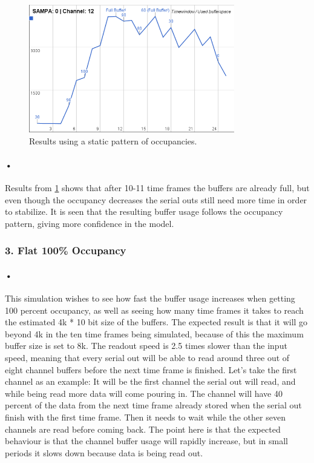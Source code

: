 \documentclass[a4paper, 12pt, openright, twoside]{report}
\begin{document}
\begin{figure}[h!]
	\centering
		\includegraphics[width=0.8\textwidth]{images/results-alternating.png}
		\caption{Results using a static pattern of occupancies.}
		\label{fig:results-alternating}
\end{figure}

\paragraph{•} %
Results from \ref{fig:results-alternating} shows that after 10-11 time frames the buffers are already full, but even though the occupancy decreases the serial outs still need more time in order to stabilize.
It is seen that the resulting buffer usage follows the occupancy pattern, giving more confidence in the model.

\subsubsection{3. Flat 100\% Occupancy}

\paragraph{•} %
This simulation wishes to see how fast the buffer usage increases when getting 100 percent occupancy, as well as seeing how many time frames it takes to reach the estimated 4k * 10 bit size of the buffers.
The expected result is that it will go beyond 4k in the ten time frames being simulated, because of this the maximum buffer size is set to 8k.
The readout speed is 2.5 times slower than the input speed, meaning that every serial out will be able to read around three out of eight channel buffers before the next time frame is finished.
Let's take the first channel as an example: It will be the first channel the serial out will read, and while being read more data will come pouring in.
The channel will have 40 percent of the data from the next time frame already stored when the serial out finish with the first time frame.
Then it needs to wait while the other seven channels are read before coming back.
The point here is that the expected behaviour is that the channel buffer usage will rapidly increase, but in small periods it slows down because data is being read out.
\end{document}
